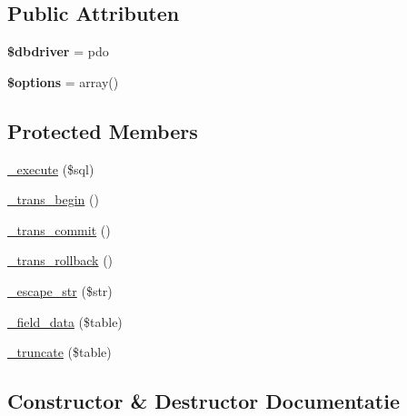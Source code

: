 \subsection*{Public Attributen}
\begin{DoxyCompactItemize}
\item 
\mbox{\label{class_c_i___d_b__pdo__driver_a0cde2a16322a023d040aa7f725877597}} 
{\bfseries \$dbdriver} = \textquotesingle{}pdo\textquotesingle{}
\item 
\mbox{\label{class_c_i___d_b__pdo__driver_a011800c63ece4cbbfa77136a20607023}} 
{\bfseries \$options} = array()
\end{DoxyCompactItemize}
\subsection*{Protected Members}
\begin{DoxyCompactItemize}
\item 
\mbox{\hyperlink{class_c_i___d_b__pdo__driver_a114ab675d89bf8324a41785fb475e86d}{\+\_\+execute}} (\$sql)
\item 
\mbox{\hyperlink{class_c_i___d_b__pdo__driver_ac81ac882c1d54347d810199a15856aac}{\+\_\+trans\+\_\+begin}} ()
\item 
\mbox{\hyperlink{class_c_i___d_b__pdo__driver_a6fe7f373e0b11cfae23a5f41c0b35dda}{\+\_\+trans\+\_\+commit}} ()
\item 
\mbox{\hyperlink{class_c_i___d_b__pdo__driver_ad49a116b0776c26b53114c9093fd102a}{\+\_\+trans\+\_\+rollback}} ()
\item 
\mbox{\hyperlink{class_c_i___d_b__pdo__driver_af8ef0237bfcdb19215b63fff769e7a55}{\+\_\+escape\+\_\+str}} (\$str)
\item 
\mbox{\hyperlink{class_c_i___d_b__pdo__driver_a95247d9671893adc3444cb184ad32ea1}{\+\_\+field\+\_\+data}} (\$table)
\item 
\mbox{\hyperlink{class_c_i___d_b__pdo__driver_aa029600528fc1ce660a23ff4b4667f95}{\+\_\+truncate}} (\$table)
\end{DoxyCompactItemize}


\subsection{Constructor \& Destructor Documentatie}
\mbox{\label{class_c_i___d_b__pdo__driver_a9162320adff1a1a4afd7f2372f753a3e}} 
